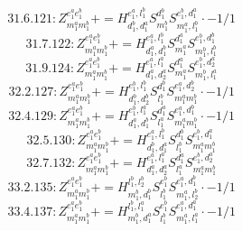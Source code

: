 \documentclass[letterpaper,10pt,fleqn,leqno,onecolumn]{article}
\begin{document}
\begin{equation} \;\;\;\;\;\;  31.6.121: Z^{e_{1}^{a}e_{1}^{b}}_{m_{1}^{a}m_{1}^{b}}+=H^{e_{1}^{a},l_{1}^{b}}_{d_{1}^{b},d_{1}^{a}}S^{d_{1}^{b}}_{m_{1}^{b}}S^{e_{1}^{b},d_{1}^{a}}_{m_{1}^{a},l_{1}^{b}}\cdot -1/1 \end{equation}
\begin{equation} \;\;\;\;\;\;  31.7.122: Z^{e_{1}^{a}e_{1}^{b}}_{m_{1}^{a}m_{1}^{b}}+=H^{e_{1}^{a},l_{1}^{b}}_{d_{1}^{a},d_{1}^{b}}S^{d_{1}^{a}}_{m_{1}^{a}}S^{e_{1}^{b},d_{1}^{b}}_{m_{1}^{b},l_{1}^{b}} \end{equation}
\begin{equation} \;\;\;\;\;\;  31.9.124: Z^{e_{1}^{a}e_{1}^{b}}_{m_{1}^{a}m_{1}^{b}}+=H^{e_{1}^{a},l_{1}^{a}}_{d_{1}^{a},d_{2}^{a}}S^{d_{1}^{a}}_{m_{1}^{a}}S^{e_{1}^{b},d_{2}^{a}}_{m_{1}^{b},l_{1}^{a}} \end{equation}
\begin{equation} \;\;\;\;\;\;  32.2.127: Z^{e_{1}^{a}e_{1}^{b}}_{m_{1}^{a}m_{1}^{b}}+=H^{e_{1}^{b},l_{1}^{b}}_{d_{1}^{b},d_{2}^{b}}S^{d_{1}^{b}}_{l_{1}^{b}}S^{e_{1}^{a},d_{2}^{b}}_{m_{1}^{a}m_{1}^{b}}\cdot -1/1 \end{equation}
\begin{equation} \;\;\;\;\;\;  32.4.129: Z^{e_{1}^{a}e_{1}^{b}}_{m_{1}^{a}m_{1}^{b}}+=H^{e_{1}^{b},l_{1}^{a}}_{d_{1}^{a},d_{1}^{b}}S^{d_{1}^{a}}_{l_{1}^{a}}S^{e_{1}^{a},d_{1}^{b}}_{m_{1}^{a}m_{1}^{b}}\cdot -1/1 \end{equation}
\begin{equation} \;\;\;\;\;\;  32.5.130: Z^{e_{1}^{a}e_{1}^{b}}_{m_{1}^{a}m_{1}^{b}}+=H^{e_{1}^{a},l_{1}^{b}}_{d_{1}^{b},d_{1}^{a}}S^{d_{1}^{b}}_{l_{1}^{b}}S^{e_{1}^{b},d_{1}^{a}}_{m_{1}^{a}m_{1}^{b}} \end{equation}
\begin{equation} \;\;\;\;\;\;  32.7.132: Z^{e_{1}^{a}e_{1}^{b}}_{m_{1}^{a}m_{1}^{b}}+=H^{e_{1}^{a},l_{1}^{a}}_{d_{1}^{a},d_{2}^{a}}S^{d_{1}^{a}}_{l_{1}^{a}}S^{e_{1}^{b},d_{2}^{a}}_{m_{1}^{a}m_{1}^{b}} \end{equation}
\begin{equation} \;\;\;\;\;\;  33.2.135: Z^{e_{1}^{a}e_{1}^{b}}_{m_{1}^{a}m_{1}^{b}}+=H^{l_{1}^{b},l_{2}^{b}}_{m_{1}^{b},d_{1}^{b}}S^{e_{1}^{b}}_{l_{1}^{b}}S^{e_{1}^{a},d_{1}^{b}}_{m_{1}^{a},l_{2}^{b}}\cdot -1/1 \end{equation}
\begin{equation} \;\;\;\;\;\;  33.4.137: Z^{e_{1}^{a}e_{1}^{b}}_{m_{1}^{a}m_{1}^{b}}+=H^{l_{1}^{b},l_{1}^{a}}_{m_{1}^{b},d_{1}^{a}}S^{e_{1}^{b}}_{l_{1}^{b}}S^{e_{1}^{a},d_{1}^{a}}_{m_{1}^{a},l_{1}^{a}}\cdot -1/1 \end{equation}
\end{document}
